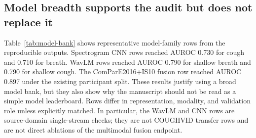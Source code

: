 \documentclass[preprint,12pt]{elsarticle}
\begin{document}
\begin{table}[t]
\centering
\caption{Fixed cough-only model-family ladder. Each row keeps the modality fixed to cough and follows the same model family across validation tiers. Models are retrained within the corresponding source-domain protocol; values are AUROC.}
\label{tab:fixed-cough-ladder}
\small
{}
\end{table}

\subsection{Model breadth supports the audit but does not replace it}

Table~\ref{tab:model-bank} shows representative model-family rows from the reproducible outputs. Spectrogram CNN rows reached AUROC 0.730 for cough and 0.710 for breath. WavLM rows reached AUROC 0.790 for shallow breath and 0.790 for shallow cough. The ComParE2016+IS10 fusion row reached AUROC 0.897 under the existing participant split. These results justify using a broad model bank, but they also show why the manuscript should not be read as a simple model leaderboard. Rows differ in representation, modality, and validation role unless explicitly matched. In particular, the WavLM and CNN rows are source-domain single-stream checks; they are not COUGHVID transfer rows and are not direct ablations of the multimodal fusion endpoint.
\end{document}
